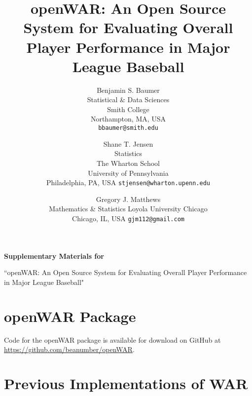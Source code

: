 \documentclass[letterpaper,titlepage]{article}
\begin{document}
\title{openWAR: An Open Source System for Evaluating Overall Player Performance in Major League Baseball}
%
\author{
Benjamin S. Baumer \\
Statistical \& Data Sciences \\
Smith College \\
Northampton, MA, USA \\
\texttt{bbaumer@smith.edu}
\and
Shane T. Jensen\\
Statistics \\ 
The Wharton School\\
University of Pennsylvania\\
Philadelphia, PA, USA
\texttt{stjensen@wharton.upenn.edu}
\and
Gregory J. Matthews\\
Mathematics \& Statistics
Loyola University Chicago\\
Chicago, IL, USA
\texttt{gjm112@gmail.com}
}






\phantom{xxxx}

\vspace{3cm}

\begin{center}
{\Large  {\bf Supplementary Materials for \\ 

\vspace{2cm}

``openWAR: An Open Source System for Evaluating Overall Player Performance in Major League Baseball"}}
\end{center}

\newpage

\appendix

\section{openWAR Package}

Code for the openWAR package is available for download on GitHub at \url{https://github.com/beanumber/openWAR}.

\section{Previous Implementations of WAR}
\label{sec:war_compare}
\end{document}
